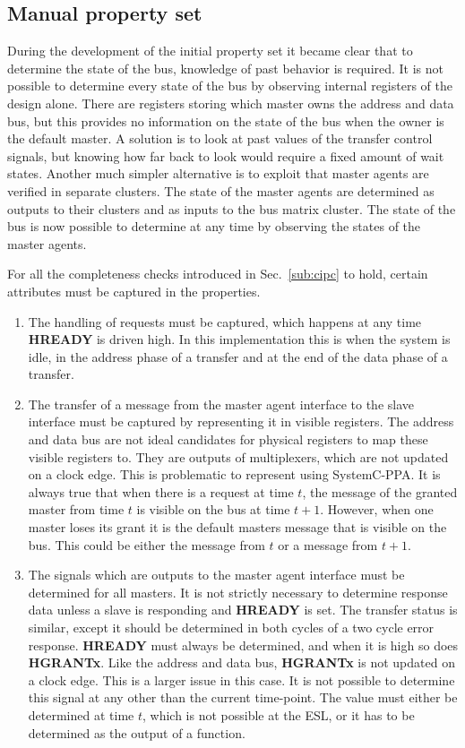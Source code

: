 \subsection{Manual property set}
During the development of the initial property set it became clear that to determine the state of the bus, knowledge of past behavior is required. It is not possible to determine every state of the bus by observing internal registers of the design alone. There are registers storing which master owns the address and data bus, but this provides no information on the state of the bus when the owner is the default master. A solution is to look at past values of the transfer  control signals, but knowing how far back to look would require a fixed amount of wait states. Another much simpler alternative is to exploit that master agents are verified in separate clusters. The state of the master agents are determined as outputs to their clusters and as inputs to the bus matrix cluster. The state of the bus is now possible to determine at any time by observing the states of the master agents. \par
For all the completeness checks introduced in Sec.~\ref{sub:cipc} to hold, certain attributes must be captured in the properties. 
\begin{enumerate}
 \item The handling of requests must be captured, which happens at any time \textbf{HREADY} is driven high. In this implementation this is when the system is idle, in the address phase of a transfer and at the end of the data phase of a transfer.
 \item The transfer of a message from the master agent interface to the slave interface must be captured by representing it in visible registers. The address and data bus are not ideal candidates for physical registers to map these visible registers to. They are outputs of multiplexers, which are not updated on a clock edge. This is problematic to represent using SystemC-PPA. It is always true that when there is a request at time $t$, the message of the granted master from time $t$ is visible on the bus at time $t+1$. However, when one master loses its grant it is the default masters message that is visible on the bus. This could be either the message from $t$ or a message from $t+1$.  
 \item The signals which are outputs to the master agent interface must be determined for all masters. It is not strictly necessary to determine response data unless a slave is responding and \textbf{HREADY} is set. The transfer status is similar, except it should be determined in both cycles of a two cycle error response. \textbf{HREADY} must always be determined, and when it is high so does \textbf{HGRANTx}. Like the address and data bus, \textbf{HGRANTx} is not updated on a clock edge. This is a larger issue in this case. It is not possible to determine this signal at any other than the current time-point. The value must either be determined at time $t$, which is not possible at the ESL, or it has to be determined as the output of a function. 
\end{enumerate} 

